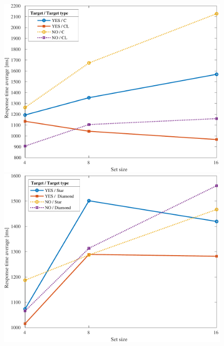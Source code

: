 \section{\result}
\begin{table}[H]
    \centering
    \fontsize{4}{1}\selectfont\ttfamily
    
\end{table}
\begin{table}[H]
    \centering
    \fontsize{4}{1}\selectfont\ttfamily
    
\end{table}
\begin{figure}[H]
    \centering
    \begin{minipage}{.24\textwidth}
        \centering
        \includegraphics[keepaspectratio,width=\textwidth]{../../Figures/13_01_graph.pdf}
    \end{minipage}
    \begin{minipage}{.24\textwidth}
        \centering
        \includegraphics[keepaspectratio,width=\textwidth]{../../Figures/13_02_graph.pdf}

\end{minipage}
\end{figure}
